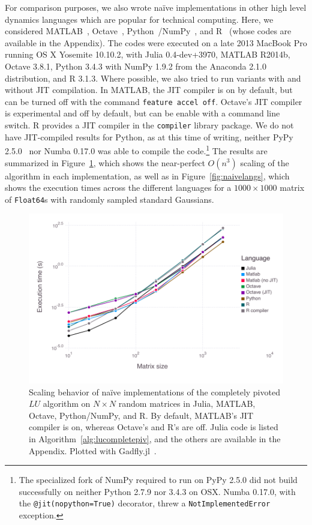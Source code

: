 For comparison purposes, we also wrote na\"ive implementations in other high
level dynamics languages which are popular for technical computing. Here, we
considered MATLAB~\cite{matlab}, Octave~\cite{octave},
Python~\cite{python}/NumPy~\cite{numpy}, and R~\cite{rlang} (whose codes are
available in the Appendix). The codes were executed on a late 2013 MacBook Pro
running OS X
Yosemite 10.10.2, with Julia 0.4-dev+3970, MATLAB R2014b, Octave 3.8.1, Python
3.4.3 with NumPy 1.9.2 from the Anaconda 2.1.0 distribution, and R 3.1.3. Where
possible, we also tried to run variants with and without JIT compilation. In
MATLAB, the JIT compiler is on by default, but can be turned off with the
command \lstinline|feature accel off|. Octave's JIT compiler is experimental
and off by default, but can be enable with a command line switch. R provides a
JIT compiler in the \lstinline|compiler| library package. We do not have
JIT-compiled results for Python, as at this time of writing, neither PyPy
2.5.0~\cite{Bolz2009} nor Numba 0.17.0 was able to compile the code.\footnote{
The specialized fork of NumPy required to run on PyPy 2.5.0 did not build
successfully on neither Python 2.7.9 nor 3.4.3 on OSX. Numba 0.17.0, with the
\lstinline|@jit(nopython=True)| decorator, threw a
\lstinline|NotImplementedError| exception.}
The results are summarized in Figure~\ref{fig:scaling}, which shows the
near-perfect $O(n^3)$ scaling of the algorithm in each implementation, as well
as in Figure~\ref{fig:naivelangs}, which shows the execution times across the
different languages for a $1000 \times 1000$ matrix of \lstinline|Float64|s
with randomly sampled standard Gaussians.



\begin{figure}
	\includegraphics[width=\columnwidth]{data/fig-scaling}
	\caption{Scaling behavior of na\"ive implementations of the completely
	pivoted $LU$ algorithm on $N\times N$ random matrices in Julia, MATLAB,
	Octave, Python/NumPy, and R. By default, MATLAB's JIT compiler is on,
	whereas Octave's and R's are off. Julia code is listed in
	Algorithm~\ref{alg:lucompletepiv}, and the others are available in the
	Appendix. Plotted with Gadfly.jl~\cite{gadfly_jl}.}
	\label{fig:scaling}
\end{figure}

